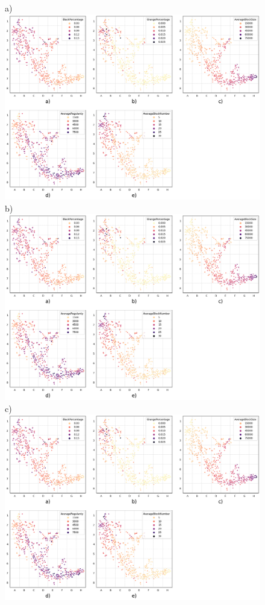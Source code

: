 \documentclass[preprint,10pt]{elsarticle} %
\begin{document}
\begin{figure}
\centering
\scriptsize{a)} \includegraphics[trim={ 7 416 703 0 },clip,scale=0.40]{Images/City_Types_Dimension_chessboard.png}
\scriptsize{b)} \includegraphics[trim={ 357 416 350 0 },clip,scale=0.40]{Images/City_Types_Dimension_chessboard.png}
\\ \scriptsize{c)} \includegraphics[trim={ 703 416 0 0 },clip,scale=0.40]{Images/City_Types_Dimension_chessboard.png}

\end{figure}
\end{document}
